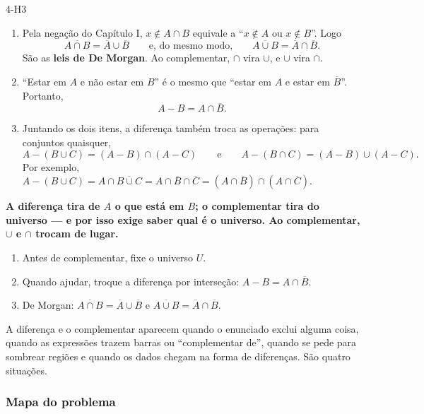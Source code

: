 \begin{construcao}{4-H3}
\begin{enumerate}[label=(\arabic*)]
  \item Pela negação do Capítulo I, $x\notin A\cap B$ equivale a \enquote{$x\notin A$ ou $x\notin B$}. Logo
\[
\overline{A\cap B}=\overline{A}\cup\overline{B}\qquad\text{e, do mesmo modo,}\qquad \overline{A\cup B}=\overline{A}\cap\overline{B}.
\]
São as \textbf{leis de De Morgan}. Ao complementar, $\cap$ vira $\cup$, e $\cup$ vira $\cap$.
  \item \enquote{Estar em $A$ e não estar em $B$} é o mesmo que \enquote{estar em $A$ e estar em $\overline{B}$}. Portanto,
\[
A-B=A\cap\overline{B}.
\]
  \item Juntando os dois itens, a diferença também troca as operações: para conjuntos quaisquer,
\[
A-(B\cup C)=(A-B)\cap(A-C)\qquad\text{e}\qquad A-(B\cap C)=(A-B)\cup(A-C).
\]
Por exemplo, $A-(B\cup C)=A\cap\overline{B\cup C}=A\cap\overline{B}\cap\overline{C}=(A\cap\overline{B})\cap(A\cap\overline{C})$.
\end{enumerate}
\end{construcao}

\begin{paralembrar}\label{lembrar-u4}
\textbf{A diferença tira de $A$ o que está em $B$; o complementar tira do universo — e por isso exige saber qual é o universo. Ao complementar, $\cup$ e $\cap$ trocam de lugar.}
\begin{enumerate}[label=\arabic*.,leftmargin=1.4em,itemsep=1pt]
  \item Antes de complementar, fixe o universo $U$.
  \item Quando ajudar, troque a diferença por interseção: $A-B=A\cap\overline{B}$.
  \item De Morgan: $\overline{A\cap B}=\overline{A}\cup\overline{B}$ e $\overline{A\cup B}=\overline{A}\cap\overline{B}$.
\end{enumerate}
\end{paralembrar}

\OndeEUsado

A diferença e o complementar aparecem quando o enunciado exclui alguma coisa, quando as expressões trazem barras ou \enquote{complementar de}, quando se pede para sombrear regiões e quando os dados chegam na forma de diferenças. São quatro situações.

\subsubsection{Mapa do problema}

